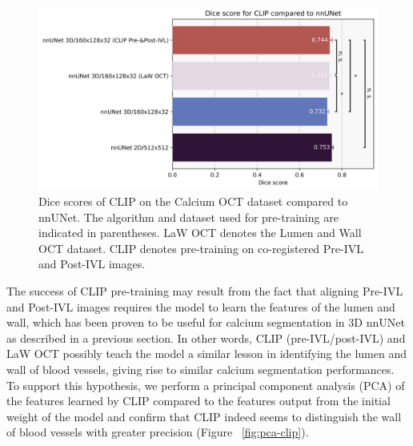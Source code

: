 \documentclass[a4paper,11pt,oneside]{report}
\begin{document}
\begin{figure}[h]
    \centering
    \includegraphics[width=0.65\linewidth]{figures/result_nnUNet_and_CLIP_results.png}
    \caption{Dice scores of CLIP on the Calcium OCT dataset compared to nnUNet. The algorithm and dataset used for pre-training are indicated in parentheses. LaW OCT denotes the Lumen and Wall OCT dataset. CLIP denotes pre-training on co-registered Pre-IVL and Post-IVL images.
    }
    \label{fig:clip-results}
\end{figure}

The success of CLIP pre-training may result from the fact that aligning Pre-IVL and Post-IVL images requires the model to learn the features of the lumen and wall, which has been proven to be useful for calcium segmentation in 3D nnUNet as described in a previous section. In other words, CLIP (pre-IVL/post-IVL) and LaW OCT possibly teach the model a similar lesson in identifying the lumen and wall of blood vessels, giving rise to similar calcium segmentation performances. To support this hypothesis, we perform a principal component analysis (PCA) of the features learned by CLIP compared to the features output from the initial weight of the model and confirm that CLIP indeed seems to distinguish the wall of blood vessels with greater precision (Figure ~\ref{fig:pca-clip}).
\end{document}
